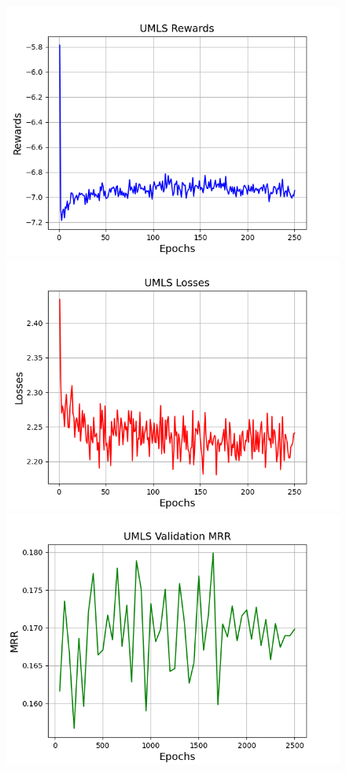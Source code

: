 \begin{figure}
    \centering
    \begin{minipage}{.5\textwidth}
      \centering
      \includegraphics[width=0.9\linewidth]{appendices/umls/uncertainty/gan_train_umls_rewards.png}
    \end{minipage}%
    \begin{minipage}{.5\textwidth}
      \centering
      \includegraphics[width=0.9\linewidth]{appendices/umls/uncertainty/gan_train_umls_losses.png}
    \end{minipage}
    \begin{minipage}{.5\textwidth}
      \centering
      \includegraphics[width=0.9\linewidth]{appendices/umls/uncertainty/gan_train_umls_mrr.png}

\end{minipage}
\end{figure}
